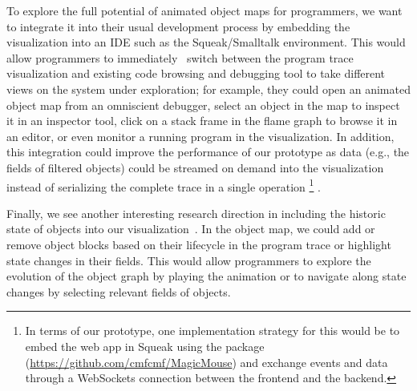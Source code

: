 To explore the full potential of animated object maps for programmers, we want to integrate it into their usual development process by embedding the visualization into an IDE such as the Squeak/Smalltalk environment.
This would allow programmers to immediately~\cite{ungar1997debugging} switch between the program trace visualization and existing code browsing and debugging tool to take different views on the system under exploration; for example, they could open an animated object map from an omniscient debugger, select an object in the map to inspect it in an inspector tool, click on a stack frame in the flame graph to browse it in an editor, or even monitor a running program in the visualization.
In addition, this integration could improve the performance of our prototype as data (e.g., the fields of filtered objects) could be streamed on demand into the visualization instead of serializing the complete trace in a single operation%
\footnote{In terms of our \tfd{} prototype, one implementation strategy for this would be to embed the web app in Squeak using the  package (\url{https://github.com/cmfcmf/MagicMouse}) and exchange events and data through a WebSockets connection between the frontend and the backend.}%
.

Finally, we see another interesting research direction in including the historic state of objects into our visualization~\cite{thiede2023object,thiede2023time}.
In the object map, we could add or remove object blocks based on their lifecycle in the program trace or highlight state changes in their fields.
This would allow programmers to explore the evolution of the object graph by playing the animation or to navigate along state changes by selecting relevant fields of objects.
